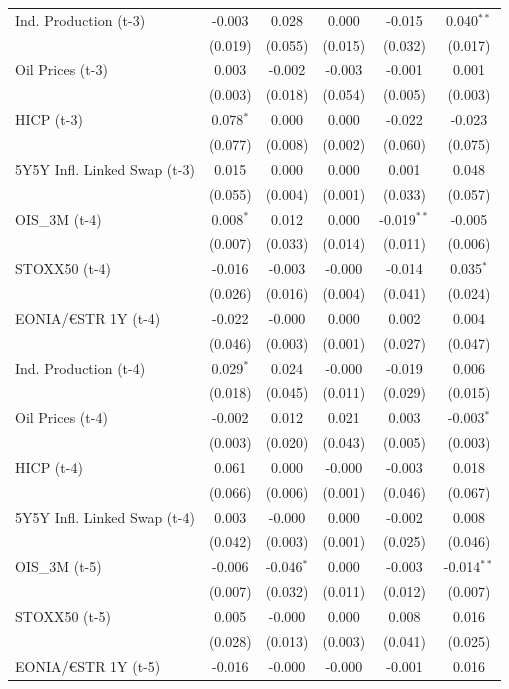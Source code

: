 \begin{longtable}[t]{lccccc}
Ind. Production (t-3) & -0.003 & 0.028 & 0.000 & -0.015 & 0.040$^{**}$\\
 & (0.019) & (0.055) & (0.015) & (0.032) & (0.017)\\
Oil Prices (t-3) & 0.003 & -0.002 & -0.003 & -0.001 & 0.001\\
 & (0.003) & (0.018) & (0.054) & (0.005) & (0.003)\\
HICP (t-3) & 0.078$^{*}$ & 0.000 & 0.000 & -0.022 & -0.023\\
 & (0.077) & (0.008) & (0.002) & (0.060) & (0.075)\\
5Y5Y Infl. Linked Swap (t-3) & 0.015 & 0.000 & 0.000 & 0.001 & 0.048\\
 & (0.055) & (0.004) & (0.001) & (0.033) & (0.057)\\
OIS\_3M (t-4) & 0.008$^{*}$ & 0.012 & 0.000 & -0.019$^{**}$ & -0.005\\
 & (0.007) & (0.033) & (0.014) & (0.011) & (0.006)\\
STOXX50 (t-4) & -0.016 & -0.003 & -0.000 & -0.014 & 0.035$^{*}$\\
 & (0.026) & (0.016) & (0.004) & (0.041) & (0.024)\\
EONIA/€STR 1Y (t-4) & -0.022 & -0.000 & 0.000 & 0.002 & 0.004\\
 & (0.046) & (0.003) & (0.001) & (0.027) & (0.047)\\
Ind. Production (t-4) & 0.029$^{*}$ & 0.024 & -0.000 & -0.019 & 0.006\\
 & (0.018) & (0.045) & (0.011) & (0.029) & (0.015)\\
Oil Prices (t-4) & -0.002 & 0.012 & 0.021 & 0.003 & -0.003$^{*}$\\
 & (0.003) & (0.020) & (0.043) & (0.005) & (0.003)\\
HICP (t-4) & 0.061 & 0.000 & -0.000 & -0.003 & 0.018\\
 & (0.066) & (0.006) & (0.001) & (0.046) & (0.067)\\
5Y5Y Infl. Linked Swap (t-4) & 0.003 & -0.000 & 0.000 & -0.002 & 0.008\\
 & (0.042) & (0.003) & (0.001) & (0.025) & (0.046)\\
OIS\_3M (t-5) & -0.006 & -0.046$^{*}$ & 0.000 & -0.003 & -0.014$^{**}$\\
 & (0.007) & (0.032) & (0.011) & (0.012) & (0.007)\\
STOXX50 (t-5) & 0.005 & -0.000 & 0.000 & 0.008 & 0.016\\
 & (0.028) & (0.013) & (0.003) & (0.041) & (0.025)\\
EONIA/€STR 1Y (t-5) & -0.016 & -0.000 & -0.000 & -0.001 & 0.016\\

\end{longtable}
